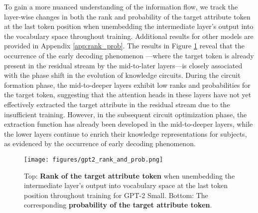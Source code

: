 To gain a more nuanced understanding of the information flow, we track the layer-wise changes in both the rank and probability of the target attribute token at the last token position when unembedding the intermediate layer’s output into the vocabulary space throughout training.
Additional results for other models are provided in Appendix \ref{app:rank_prob}.
The results in Figure \ref{fig:gpt2_rank_and_prob} reveal that the occurrence of the early decoding phenomenon \citep{logit_lens}—where the target token is already present in the residual stream by the mid-to-later layers—is closely associated with the phase shift in the evolution of knowledge circuits.
During the circuit formation phase, the mid-to-deeper layers exhibit low ranks and probabilities for the target token, suggesting that the attention heads in these layers have not yet effectively extracted the target attribute in the residual stream due to the insufficient training.
However, in the subsequent circuit optimization phase, the extraction function has already been developed in the mid-to-deeper layers, while the lower layers continue to enrich their knowledge representations for subjects, as evidenced by the occurrence of early decoding phenomenon.

\begin{figure}
    \centering
    \texttt{[image: figures/gpt2\_rank\_and\_prob.png]}
    \caption{Top: \textbf{Rank of the target attribute token} when unembedding the intermediate layer’s output into vocabulary space at the last token position throughout training for GPT-2 Small. Bottom: The corresponding \textbf{probability of the target attribute token}.}
    \label{fig:gpt2_rank_and_prob}
    \vspace{-10pt}
\end{figure}